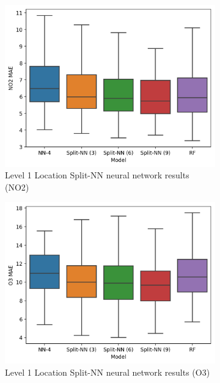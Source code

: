 \documentclass[journal abbreviation, manuscript]{copernicus}
\begin{document}
\begin{figure}[H]
\centering
\begin{subfigure}{0.45\textwidth}
\includegraphics[width=\textwidth]{results/split-no2-location-mae}
\caption{Level 1 Location Split-NN neural network results (NO2)}
\end{subfigure}
\begin{subfigure}{0.45\textwidth}
\includegraphics[width=\textwidth]{results/split-o3-location-mae}
\caption{Level 1 Location Split-NN neural network results (O3)}
\end{subfigure}
\begin{subfigure}{0.45\textwidth}

\end{subfigure}
\end{figure}
\end{document}
